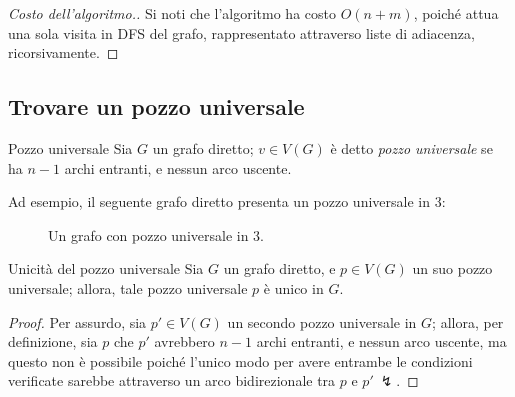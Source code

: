 \documentclass[a4paper, 12pt]{report}
\begin{document}
    \begin{proof}[Costo dell'algoritmo.]
        Si noti che l'algoritmo ha costo $O(n + m)$, poiché attua una sola visita in DFS del grafo, rappresentato attraverso liste di adiacenza, ricorsivamente.
    \end{proof}

    \subsection{Trovare un pozzo universale}

    \begin{frameddefn}{Pozzo universale}
        Sia $G$ un grafo diretto; $v \in V(G)$ è detto \textit{pozzo universale} se ha $n - 1$ archi entranti, e nessun arco uscente.
    \end{frameddefn}

    \begin{example}
        Ad esempio, il seguente grafo diretto presenta un pozzo universale in $3$:

        \begin{figure}[H]
            \centering
            \caption{Un grafo con pozzo universale in $3$.}
        \end{figure}
    \end{example}

    \begin{framedthm}{Unicità del pozzo universale}
        Sia $G$ un grafo diretto, e $p \in V(G)$ un suo pozzo universale; allora, tale pozzo universale $p$ è unico in $G$.
    \end{framedthm}

    \begin{proof}
        Per assurdo, sia $p' \in V(G)$ un secondo pozzo universale in $G$; allora, per definizione, sia $p$ che $p'$ avrebbero $n - 1$ archi entranti, e nessun arco uscente, ma questo non è possibile poiché l'unico modo per avere entrambe le condizioni verificate sarebbe attraverso un arco bidirezionale tra $p$ e $p' \ \lightning$.
    \end{proof}
\end{document}
